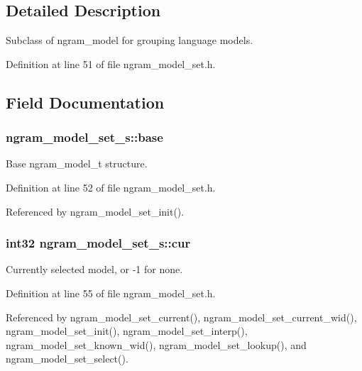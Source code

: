 \subsection{Detailed Description}
Subclass of ngram\-\_\-model for grouping language models. 

Definition at line 51 of file ngram\-\_\-model\-\_\-set.\-h.



\subsection{Field Documentation}
\subsubsection[{base}]{ ngram\-\_\-model\-\_\-set\-\_\-s\-::base}\label{structngram__model__set__s_a3b88f17aa148ceac4f32dd4cbf5f4f81}


Base ngram\-\_\-model\-\_\-t structure. 



Definition at line 52 of file ngram\-\_\-model\-\_\-set.\-h.



Referenced by ngram\-\_\-model\-\_\-set\-\_\-init().

\subsubsection[{cur}]{\setlength{\rightskip}{0pt plus 5cm}int32 ngram\-\_\-model\-\_\-set\-\_\-s\-::cur}\label{structngram__model__set__s_a031e7d7dcf1667f69e1cb980f45623cb}


Currently selected model, or -\/1 for none. 



Definition at line 55 of file ngram\-\_\-model\-\_\-set.\-h.



Referenced by ngram\-\_\-model\-\_\-set\-\_\-current(), ngram\-\_\-model\-\_\-set\-\_\-current\-\_\-wid(), ngram\-\_\-model\-\_\-set\-\_\-init(), ngram\-\_\-model\-\_\-set\-\_\-interp(), ngram\-\_\-model\-\_\-set\-\_\-known\-\_\-wid(), ngram\-\_\-model\-\_\-set\-\_\-lookup(), and ngram\-\_\-model\-\_\-set\-\_\-select().

